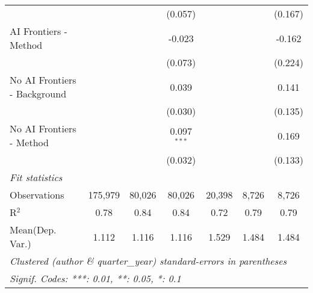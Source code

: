 \begin{tabular}{lcccccc}
                                &               &             & (0.057)       &               &         & (0.167)\\   
   AI Frontiers - Method        &               &             & -0.023        &               &         & -0.162\\   
                                &               &             & (0.073)       &               &         & (0.224)\\   
   No AI Frontiers - Background &               &             & 0.039         &               &         & 0.141\\   
                                &               &             & (0.030)       &               &         & (0.135)\\   
   No AI Frontiers - Method     &               &             & 0.097$^{***}$ &               &         & 0.169\\   
                                &               &             & (0.032)       &               &         & (0.133)\\   
   \midrule
   \emph{Fit statistics}\\
   Observations                 & 175,979       & 80,026      & 80,026        & 20,398        & 8,726   & 8,726\\  
   R$^2$                        & 0.78          & 0.84        & 0.84          & 0.72          & 0.79    & 0.79\\  
Mean(Dep. Var.) & 1.112 & 1.116 & 1.116 & 1.529 & 1.484 & 1.484 \\
   \midrule \midrule
   \multicolumn{7}{l}{\emph{Clustered (author \& quarter\_year) standard-errors in parentheses}}\\
   \multicolumn{7}{l}{\emph{Signif. Codes: ***: 0.01, **: 0.05, *: 0.1}}\\
\end{tabular}
\par\endgroup
